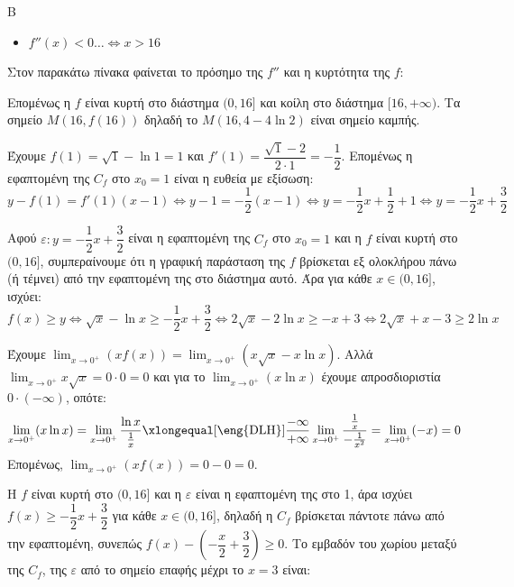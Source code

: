 \begin{thema}{Β}
\begin{erwthma}
\begin{itemize}
    \item $f''(x) < 0 \dots \Leftrightarrow x>16$
\end{itemize}
Στον παρακάτω πίνακα φαίνεται το πρόσημο της $f''$ και η κυρτότητα της $f$:
\begin{center}
\end{center}
Επομένως η $f$ είναι κυρτή στο διάστημα $(0, 16]$ και κοίλη στο διάστημα $[16, +\infty)$. Τα σημείο $M(16, f(16))$ δηλαδή το $M(16, 4-4\ln 2)$ είναι σημείο καμπής.
\item Έχουμε $f(1) = \sqrt{1} - \ln 1 = 1$ και $f'(1) = \dfrac{\sqrt{1}-2}{2\cdot 1} = -\dfrac{1}{2}$. Επομένως η εφαπτομένη της $C_f$ στο $x_0=1$ είναι η ευθεία με εξίσωση:
\[y - f(1) = f'(1)(x-1) \Leftrightarrow y - 1 = -\dfrac{1}{2}(x-1) \Leftrightarrow y = -\dfrac{1}{2}x + \dfrac{1}{2} + 1 \Leftrightarrow y = -\dfrac{1}{2}x + \dfrac{3}{2}\]
\item Αφού $\varepsilon: y = -\dfrac{1}{2}x + \dfrac{3}{2}$ είναι η εφαπτομένη της $C_f$ στο $x_0=1$ και η $f$ είναι κυρτή στο $(0, 16]$, συμπεραίνουμε ότι η γραφική παράσταση της $f$ βρίσκεται εξ ολοκλήρου πάνω (ή τέμνει) από την εφαπτομένη της στο διάστημα αυτό. Άρα για κάθε $x \in (0, 16]$, ισχύει:
\[f(x) \ge y \Leftrightarrow \sqrt{x} - \ln x \ge -\dfrac{1}{2}x + \dfrac{3}{2} \Leftrightarrow 2\sqrt{x} - 2\ln x \ge -x + 3 \Leftrightarrow 2\sqrt{x} + x - 3 \ge 2\ln x\]
\item Έχουμε $\displaystyle\lim_{x\to0^+} (xf(x)) = \lim_{x\to0^+} (x\sqrt{x} - x\ln x)$.
Αλλά $\displaystyle\lim_{x\to0^+} x\sqrt{x} = 0 \cdot 0 = 0$ και για το $\displaystyle\lim_{x\to0^+} (x\ln x)$ έχουμε απροσδιοριστία $0 \cdot (-\infty)$, οπότε:
\[\lim_{x\to0^+} (x\ln x) = \lim_{x\to0^+} \dfrac{\ln x}{\frac{1}{x}} \xlongequal[\text{\eng{DLH}}]{\frac{-\infty}{+\infty}} \lim_{x\to0^+} \dfrac{\frac{1}{x}}{-\frac{1}{x^2}} = \lim_{x\to0^+} (-x) = 0\]
Επομένως, $\displaystyle\lim_{x\to0^+} (xf(x)) = 0 - 0 = 0$.
\item Η $f$ είναι κυρτή στο $(0, 16]$ και η $\varepsilon$ είναι η εφαπτομένη της στο 1, άρα ισχύει $f(x) \ge -\dfrac{1}{2}x + \dfrac{3}{2}$ για κάθε $x \in (0, 16]$, δηλαδή η $C_f$ βρίσκεται πάντοτε πάνω από την εφαπτομένη, συνεπώς $f(x) - \left(-\dfrac{x}{2} + \dfrac{3}{2}\right) \ge 0$. Το εμβαδόν του χωρίου μεταξύ της $C_f$, της $\varepsilon$ από το σημείο επαφής μέχρι το $x=3$ είναι:

\end{erwthma}
\end{thema}

